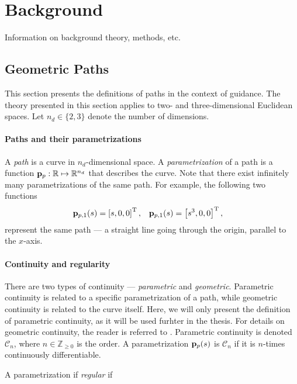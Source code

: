 \chapter{Background}
\label{chap:background}

Information on background theory, methods, etc.

\section{Geometric Paths}
\label{sec:background_paths}

This section presents the definitions of paths in the context of guidance.
The theory presented in this section applies to two- and three-dimensional Euclidean spaces.
Let $n_d \in \{2,3\}$ denote the number of dimensions.

\subsubsection*{Paths and their parametrizations}
A \emph{path} is a curve in $n_d$-dimensional space.
A \emph{parametrization} of a path is a function $\mathbf{p}_p : \mathbb{R} \mapsto \mathbb{R}^{n_d}$ that describes the curve.
Note that there exist infinitely many parametrizations of the same path.
For example, the following two functions
\begin{align}
    \mathbf{p}_{p, 1}(s) &= \left[s, 0, 0\right]^{\mathrm{T}}, &
    \mathbf{p}_{p, 1}(s) &= \left[s^3, 0, 0\right]^{\mathrm{T}}, &
\end{align}
represent the same path --- a straight line going through the origin, parallel to the $x$-axis.

\subsubsection*{Continuity and regularity}
There are two types of continuity --- \emph{parametric} and \emph{geometric}.
Parametric continuity is related to a specific parametrization of a path, while geometric continuity is related to the curve itself.
Here, we will only present the definition of parametric continuity, as it will be used furhter in the thesis.
For details on geometric continuity, the reader is referred to \cite{barsky_geometric_1984}.
Parametric continuity is denoted $\mathcal{C}_n$, where $n \in \mathbb{Z}_{\geq 0}$ is the order.
A parametrization $\mathbf{p}_p(s)$ is $\mathcal{C}_n$ if it is $n$-times continuously differentiable.

A parametrization if \emph{regular} if 

